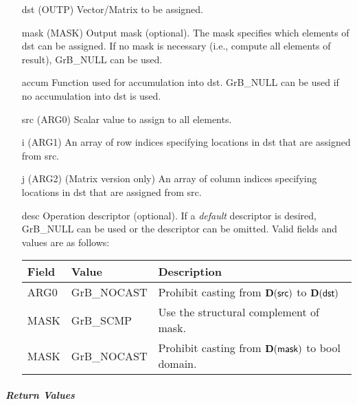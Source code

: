 \begin{itemize}[leftmargin=1.1in]
    \item[{\sf dst}]   ({\sf OUTP}) Vector/Matrix to be assigned.
    \item[{\sf mask}]  ({\sf MASK}) Output mask (optional). The mask
    specifies which elements of {\sf dst} can be assigned.
    If no mask is necessary (i.e., compute all elements of result),
    {\sf GrB\_NULL} can be used.
    \item[{\sf accum}] Function used for accumulation into dst.  {\sf GrB\_NULL}
                       can be used if no accumulation into dst is used.
    \item[{\sf src}]   ({\sf ARG0}) Scalar value to assign to all elements.
    \item[{\sf i}]     ({\sf ARG1}) An array of row indices specifying locations in dst that
                       are assigned from src.
    \item[{\sf j}]     ({\sf ARG2}) (Matrix version only) An array of column indices 
                       specifying locations in dst that are assigned from src.


    \item[{\sf desc}]   Operation descriptor (optional). If a
    \emph{default} descriptor is desired, {\sf GrB\_NULL} can be
    used or the descriptor can be omitted.  Valid fields and values are as follows: \\
    \begin{tabular}{lll}
    Field  & Value & Description \\
    \hline
    {\sf ARG0} & {\sf GrB\_NOCAST} & Prohibit casting from $\bold{D}({\sf src})$ to $\bold{D}({\sf dst})$ \\
    {\sf MASK} & {\sf GrB\_SCMP} & Use the structural complement of {\sf mask}. \\
    {\sf MASK} & {\sf GrB\_NOCAST} & Prohibit casting from $\bold{D}({\sf mask})$ to {\sf bool} domain. \\
    \end{tabular}

\end{itemize}

\subparagraph{Return Values}

